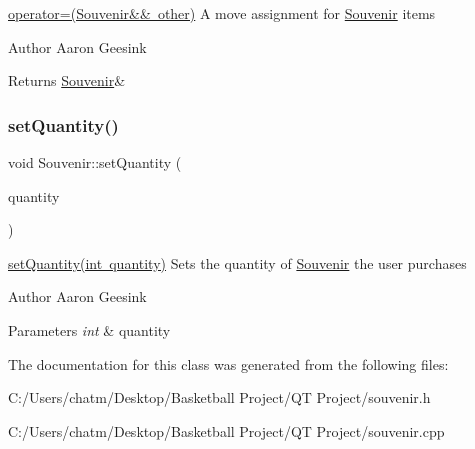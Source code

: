 \mbox{\hyperlink{class_souvenir_ac455fa569cbb12dc51d2b618f5000576}{operator=(\+Souvenir\&\& other)}} A move assignment for \mbox{\hyperlink{class_souvenir}{Souvenir}} items 

\begin{DoxyAuthor}{Author}
Aaron Geesink 
\end{DoxyAuthor}
\begin{DoxyReturn}{Returns}
\mbox{\hyperlink{class_souvenir}{Souvenir}}\& 
\end{DoxyReturn}
\mbox{\label{class_souvenir_a59e2964dafebf5083ba31b19ca5088b5}} 
\subsubsection{\texorpdfstring{setQuantity()}{setQuantity()}}
{\footnotesize\ttfamily void Souvenir\+::set\+Quantity (\begin{DoxyParamCaption}\item[{int}]{quantity }\end{DoxyParamCaption})}



\mbox{\hyperlink{class_souvenir_a59e2964dafebf5083ba31b19ca5088b5}{set\+Quantity(int quantity)}} Sets the quantity of \mbox{\hyperlink{class_souvenir}{Souvenir}} the user purchases 

\begin{DoxyAuthor}{Author}
Aaron Geesink 
\end{DoxyAuthor}

\begin{DoxyParams}{Parameters}
{\em int} & quantity \\
\hline
\end{DoxyParams}


The documentation for this class was generated from the following files\+:\begin{DoxyCompactItemize}
\item 
C\+:/\+Users/chatm/\+Desktop/\+Basketball Project/\+Q\+T Project/souvenir.\+h\item 
C\+:/\+Users/chatm/\+Desktop/\+Basketball Project/\+Q\+T Project/souvenir.\+cpp\end{DoxyCompactItemize}
